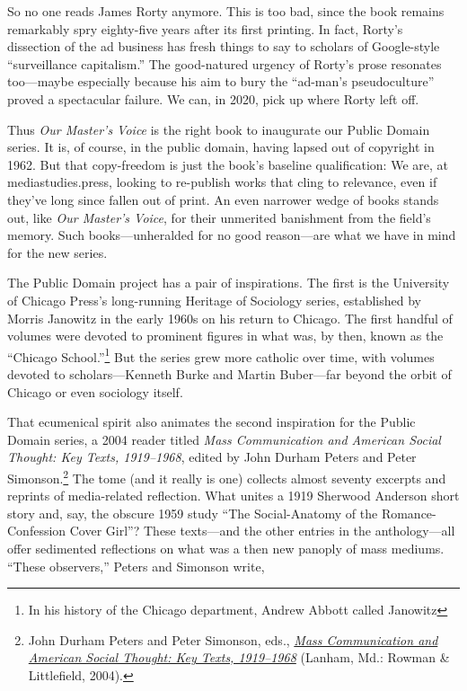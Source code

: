 \documentclass[openany,nobib]{tufte-book}
\begin{document}
So no one reads James Rorty anymore. This is too bad, since the book
remains remarkably spry eighty-five years after its first printing. In
fact, Rorty's dissection of the ad business has fresh things to say to
scholars of Google-style ``surveillance capitalism.'' The good-natured
urgency of Rorty's prose resonates too---maybe especially because his
aim to bury the ``ad-man's pseudoculture'' proved a spectacular failure.
We can, in 2020, pick up where Rorty left off.

Thus \emph{Our Master's Voice} is the right book to inaugurate our
Public Domain series. It is, of course, in the public domain, having
lapsed out of copyright in 1962. But that copy-freedom is just the
book's baseline qualification: We are, at mediastudies.press, looking to
re-publish works that cling to relevance, even if they've long since
fallen out of print. An even narrower wedge of books stands out, like
\emph{Our Master's Voice}, for their unmerited banishment from the
field's memory. Such books---unheralded for no good reason---are what we
have in mind for the new series.

The Public Domain project has a pair of inspirations. The first is the
University of Chicago Press's long-running Heritage of Sociology series,
established by Morris Janowitz in the early 1960s on his return to
Chicago. The first handful of volumes were devoted to prominent figures
in what was, by then, known as the ``Chicago School.''\footnote{In his history of the Chicago department, Andrew Abbott called
  Janowitz} But the series
grew more catholic over time, with volumes devoted to scholars---Kenneth
Burke and Martin Buber---far beyond the orbit of Chicago or even
sociology itself.

That ecumenical spirit also animates the second inspiration for the
Public Domain series, a 2004 reader titled \emph{Mass Communication and
American Social Thought: Key Texts, 1919--1968}, edited by John Durham
Peters and Peter Simonson.\footnote{John Durham Peters and Peter Simonson, eds.,
  \emph{\href{http://www.worldcat.org/oclc/54374652}{Mass Communication
  and American Social Thought: Key Texts, 1919--1968}} (Lanham, Md.:
  Rowman \& Littlefield, 2004).} The tome (and it really is one) collects
almost seventy excerpts and reprints of media-related reflection. What
unites a 1919 Sherwood Anderson short story and, say, the obscure 1959
study ``The Social-Anatomy of the Romance-Confession Cover Girl''? These
texts---and the other entries in the anthology---all offer sedimented
reflections on what was a then new panoply of mass mediums. ``These
observers,'' Peters and Simonson write,
\end{document}
